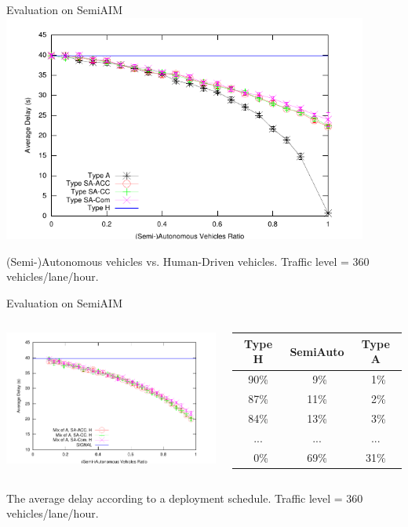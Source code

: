 \documentclass{beamer}
\begin{document}
\begin{frame}{Evaluation on SemiAIM}
\includegraphics[width=0.9\textwidth]{figures/figure_1.pdf}

(Semi-)Autonomous vehicles vs. Human-Driven vehicles. Traffic
level = 360 vehicles/lane/hour.
\end{frame}

\begin{frame}{Evaluation on SemiAIM}
\begin{columns}[c]
	\includegraphics[width=\columnwidth]{figures/figure_4.pdf}

	\small
	\begin{tabular}{|c|c|c|}
    \hline
    Type H&  SemiAuto &    Type A\\
    \hline
    90\% &      \ 9\% &   \ 1\% \\
    \hline
    87\% &     11\% &    \ 2\% \\
    \hline
    84\% &     13\% &    \ 3\% \\
    \hline
     ...&   ...&   ...\\
    \hline
    \ 0\%&     69\% &  31\% \\
    \hline
	\end{tabular}

\end{columns}

\hfill

The average delay according to a deployment schedule. Traffic level =
360 vehicles/lane/hour.
\end{frame}
\end{document}
